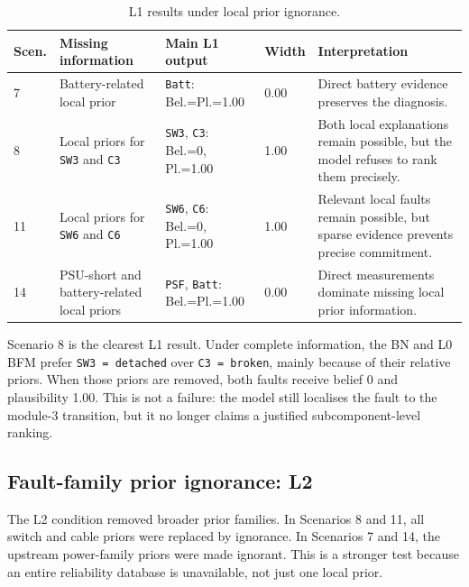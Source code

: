 \documentclass[runningheads]{llncs}
\begin{document}
\begin{table}[H]
\caption{L1 results under local prior ignorance.}\label{tab:l1_results}
\centering
\small
\begin{tabularx}{\textwidth}{p{0.8cm}p{2.9cm}p{3.8cm}p{1.1cm}X}
\toprule
Scen. & Missing information & Main L1 output & Width & Interpretation \\
\midrule
7 & Battery-related local prior & \texttt{Batt}: Bel.=Pl.=1.00 & 0.00 & Direct battery evidence preserves the diagnosis. \\
8 & Local priors for \texttt{SW3} and \texttt{C3} & \texttt{SW3}, \texttt{C3}: Bel.=0, Pl.=1.00 & 1.00 & Both local explanations remain possible, but the model refuses to rank them precisely. \\
11 & Local priors for \texttt{SW6} and \texttt{C6} & \texttt{SW6}, \texttt{C6}: Bel.=0, Pl.=1.00 & 1.00 & Relevant local faults remain possible, but sparse evidence prevents precise commitment. \\
14 & PSU-short and battery-related local priors & \texttt{PSF}, \texttt{Batt}: Bel.=Pl.=1.00 & 0.00 & Direct measurements dominate missing local prior information. \\
\bottomrule
\end{tabularx}
\end{table}

Scenario 8 is the clearest L1 result. Under complete information, the BN and L0 BFM prefer \texttt{SW3 = detached} over \texttt{C3 = broken}, mainly because of their relative priors. When those priors are removed, both faults receive belief 0 and plausibility 1.00. This is not a failure: the model still localises the fault to the module-3 transition, but it no longer claims a justified subcomponent-level ranking.

\subsection{Fault-family prior ignorance: L2}
\label{sec:l2_family_prior}

The L2 condition removed broader prior families. In Scenarios 8 and 11, all switch and cable priors were replaced by ignorance. In Scenarios 7 and 14, the upstream power-family priors were made ignorant. This is a stronger test because an entire reliability database is unavailable, not just one local prior.
\end{document}

